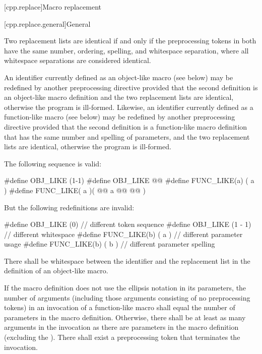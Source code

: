 [cpp.replace]{Macro replacement}%

[cpp.replace.general]{General}%
%
%

\pnum
{}%
Two replacement lists are identical if and only if
the preprocessing tokens in both have
the same number, ordering, spelling, and whitespace separation,
where all whitespace separations are considered identical.

\pnum
An identifier currently defined as an
%
object-like macro (see below) may be redefined by another
preprocessing directive provided that the second definition is an
object-like macro definition and the two replacement lists
are identical, otherwise the program is ill-formed.
Likewise, an identifier currently defined as a
%
function-like macro (see below) may be redefined by another
preprocessing directive provided that the second definition is a
function-like macro definition that has the same number and spelling
of parameters,
and the two replacement lists are identical,
otherwise the program is ill-formed.

\pnum
\begin{example}
The following sequence is valid:
\begin{codeblock}
#define OBJ_LIKE      (1-1)
#define OBJ_LIKE      @@
#define FUNC_LIKE(a)   ( a )
#define FUNC_LIKE( a )(     @@
                a @@
                  @\tcode{*/}@ )
\end{codeblock}
But the following redefinitions are invalid:
\begin{codeblock}
#define OBJ_LIKE    (0)         // different token sequence
#define OBJ_LIKE    (1 - 1)     // different whitespace
#define FUNC_LIKE(b) ( a )      // different parameter usage
#define FUNC_LIKE(b) ( b )      // different parameter spelling
\end{codeblock}
\end{example}

\pnum
{}%
There shall be whitespace between the identifier and the replacement list
in the definition of an object-like macro.

\pnum
If the macro definition does not use the ellipsis notation in its parameters,
the number of arguments (including those arguments consisting
of no preprocessing tokens)
in an invocation of a function-like macro shall
equal the number of parameters in the macro definition.
Otherwise, there shall be at least as many arguments in the invocation as there are
parameters in the macro definition (excluding the ). There
shall exist a
\tcode{)}
preprocessing token that terminates the invocation.

